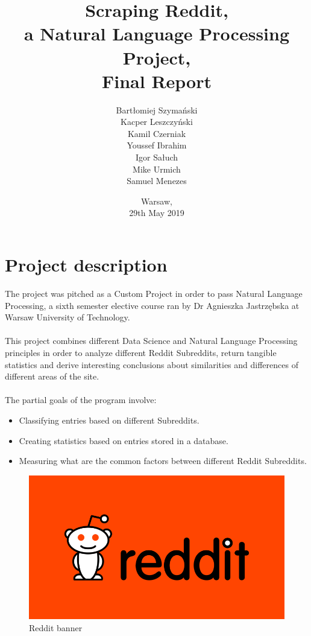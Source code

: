 \documentclass[openany]{article}
\title{Scraping Reddit, \\a Natural Language Processing Project,\\ Final Report}
\author{Bartłomiej Szymański\\
Kacper Leszczyński\\
Kamil Czerniak\\
Youssef Ibrahim\\
Igor Sałuch\\
Mike Urmich\\
Samuel Menezes}
\date{Warsaw, \\29th May 2019}
\begin{document}
\maketitle
\newpage
\tableofcontents
\newpage

\section{Project description}

The project was pitched as a Custom Project in order to pass Natural Language Processing, a sixth semester elective course ran by Dr Agnieszka Jastrzębska at Warsaw University of Technology. \\ \\
This project combines different Data Science and Natural Language Processing principles in order to analyze different Reddit Subreddits, return tangible statistics and derive interesting conclusions about similarities and differences of different areas of the site.\\ \\
The partial goals of the program involve:
\begin{itemize}
	\item Classifying entries based on different Subreddits.
	\item Creating statistics based on entries stored in a database.
	\item Measuring what are the common factors between different Reddit Subreddits.
\end{itemize}

\begin{figure}[htb!]
    \centering
    \includegraphics[width=\textwidth]{reddit_banner.png}
    \caption{Reddit banner}
    \label{fig:mesh1}
\end{figure}
\newpage
\end{document}
